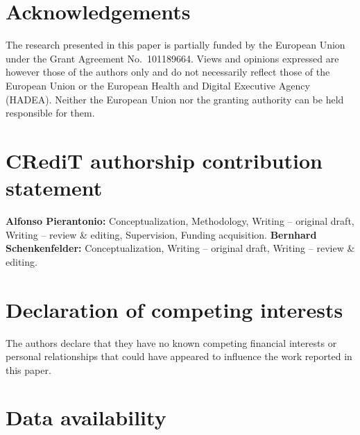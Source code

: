 \documentclass[12pt]{elsarticle}
\begin{document}

\section*{Acknowledgements}

The research presented in this paper is partially funded by the 
European Union under the Grant Agreement No.\ 101189664. Views and 
opinions expressed are however those of the authors only and do not 
necessarily reflect those of the European Union or the European Health 
and Digital Executive Agency (HADEA). Neither the European Union nor 
the granting authority can be held responsible for them.

\section*{CRediT authorship contribution statement}

\textbf{Alfonso Pierantonio:} Conceptualization, Methodology, 
Writing -- original draft, Writing -- review \& editing, 
Supervision, Funding acquisition.
\textbf{Bernhard Schenkenfelder:} Conceptualization, 
Writing -- original draft, Writing -- review \& editing.

\section*{Declaration of competing interests}

The authors declare that they have no known competing financial 
interests or personal relationships that could have appeared to 
influence the work reported in this paper.

\section*{Data availability}
\end{document}
